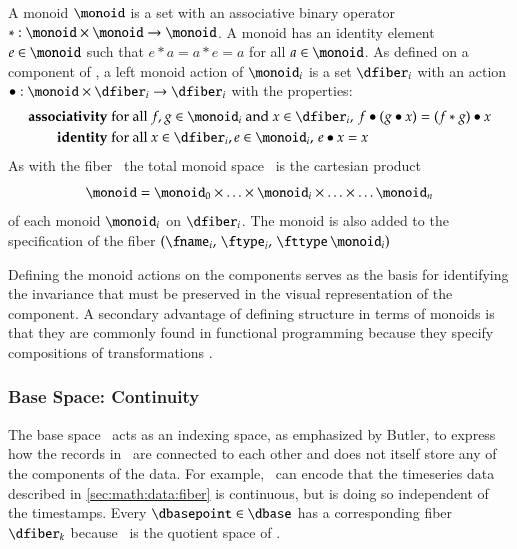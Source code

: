 \documentclass[journal]{vgtc}                %
\begin{document}
A monoid \cite{Monoid2021} $\monoid$ is a set with an associative binary operator $\ast:\monoid \times \monoid\rightarrow \monoid$. A monoid has an identity element $e\in \monoid$ such that $e\ast a= a \ast e = a$ for all $a \in \monoid$. As defined on a component of \dfiber, a left monoid action \cite{SemigroupAction2021,nlab:action} of $\monoid_i$ is a set $\dfiber_i$ with an action $\bullet: \monoid\times \dfiber_i \rightarrow \dfiber_i$ with the properties:
\begin{align*}
    \textbf{associativity}\;& \text{for all } f,g \in \monoid_i \text{ and } x\in \dfiber_i,\, f\bullet(g\bullet x) = (f\ast g) \bullet x\\
    \textbf{identity}\;& \text{for all } x\in \dfiber_i, e\in \monoid_i,\,  e\bullet x = x 
\end{align*}
As with the fiber \dfiber\, the total monoid space \monoid\ is the cartesian product
\begin{equation}\label{eq:math:data:monoid:decompose}
\monoid= \monoid_{0} \times \ldots \times \monoid_{i}\times \ldots \times\ldots \monoid_{n}
\end{equation}
of each monoid $\monoid_{i}$ on $\dfiber_{i}$.  The monoid is also added to the specification of the fiber $(\fname_i,\, \ftype_i,\, \fttype\, \monoid_i)$

Defining the monoid actions on the components serves as the basis for identifying the invariance\cite{kindlmannAlgebraicProcessVisualization2014} that must be preserved in the visual representation of the component. A secondary advantage of defining structure in terms of monoids is that they are commonly found in functional programming because they specify compositions of transformations \cite{yorgeyMonoidsThemeVariations, stievenMonadJustMonoid2020}.

\subsubsection{Base Space: Continuity}
\label{sec:math:data:base}
 The base space \dbase\ acts as an indexing space, as emphasized by Butler\cite{butlerVectorBundleClassesForm1992,butlerVisualizationModelBased1989}, to express how the records in \dtotal\ are connected to each other and does not itself store any of the components of the data. For example, \dbase\ can encode that the timeseries data described in \autoref{sec:math:data:fiber} is continuous, but is doing so independent of the timestamps. Every $\dbasepoint \in \dbase$ has a corresponding fiber $\dfiber_k$ because \dbase\ is the quotient space\cite{QuotientSpaceTopology2020,aurouxMath131Introduction} of \dtotal. 
\end{document}
